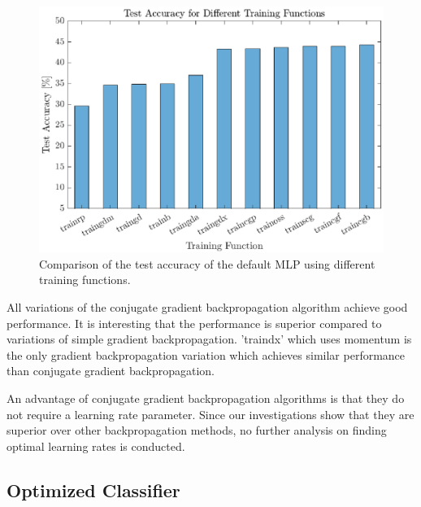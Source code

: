  \begin{figure}[h!]
 	\centering
 	\includegraphics{images/trainingFct}
 	\caption{Comparison of the test accuracy of the default MLP using different training functions.}
 	\label{fig:trainingFct}
 \end{figure}

 All variations of the conjugate gradient backpropagation algorithm\cite{moller1993scaled} achieve good performance. It is interesting that the performance is superior compared to variations of simple gradient backpropagation. 'traindx' which uses momentum is the only gradient backpropagation variation which achieves similar performance than conjugate gradient backpropagation.

 An advantage of conjugate gradient backpropagation algorithms is that they do not require a learning rate parameter. Since our investigations show that they are superior over other backpropagation methods, no further analysis on finding optimal learning rates is conducted.

\subsection{Optimized Classifier}\label{sec:optClassifier}

